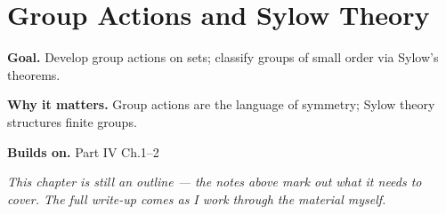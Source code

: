 \chapter{Group Actions and Sylow Theory}
\label{ch:04-abstract-algebra-03}

\begin{chapterintro}
\textbf{Goal.} Develop group actions on sets; classify groups of small order via Sylow's theorems.

\textbf{Why it matters.} Group actions are the language of symmetry; Sylow theory structures finite groups.

\textbf{Builds on.} Part IV Ch.1–2
\end{chapterintro}

\textit{This chapter is still an outline --- the notes above mark out what it needs to cover. The full write-up comes as I work through the material myself.}
